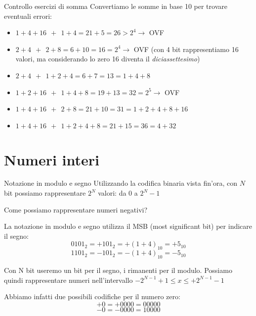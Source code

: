 \documentclass[9pt, format=169]{beamer}
\begin{document}
\begin{frame}{Controllo esercizi di somma}
Convertiamo le somme in base 10 per trovare eventuali errori:

\begin{itemize}
\item $1+4+16 \ \ + \ \ 1+4 = 21+5 = 26 > 2^4 \rightarrow$ \alert{OVF}
\item $2+4 \ \ + \ \ 2+8 = 6+10 = 16 = 2^4 \rightarrow$ \alert{OVF} (con 4 bit rappresentiamo 16 valori, ma considerando lo zero 16 diventa il \emph{diciassettesimo})
\item $2+4 \ \ + \ \ 1+2+4 = 6+7 = 13 = 1+4+8$
\item $1+2+16 \ \ + \ \ 1+4+8 = 19+13 = 32 = 2^5 \rightarrow$ \alert{OVF}
\item $1+4+16 \ \ + \ \ 2+8 = 21+10 = 31 = 1+2+4+8+16$
\item $1+4+16 \ \ + \ \ 1+2+4+8 = 21+15 = 36 = 4+32$
\end{itemize}
\end{frame}

\section{Numeri interi}
\begin{frame}{Notazione in modulo e segno}
Utilizzando la codifica binaria vista fin'ora, con $N$ bit possiamo rappresentare $2^N$ valori: da 0 a $2^N - 1$

Come possiamo rappresentare numeri negativi?

\pause

La notazione in modulo e segno utilizza il \alert{MSB} (most significant bit) per indicare il segno:
\[0101_2 = +101_2 = +(1+4)_{10} = +5_{10}\]
\[1101_2 = -101_2 = -(1+4)_{10} = -5_{10}\]

\pause

Con N bit useremo un bit per il segno, i rimanenti per il modulo.
Possiamo quindi rappresentare numeri nell'intervallo $-2^{N-1}+1 \leq x \leq +2^{N-1}-1$

\pause

Abbiamo infatti due possibili codifiche per il numero zero:
\[+0 = +0000 = 00000\]
\[-0 = -0000 = 10000\]
\end{frame}
\end{document}
